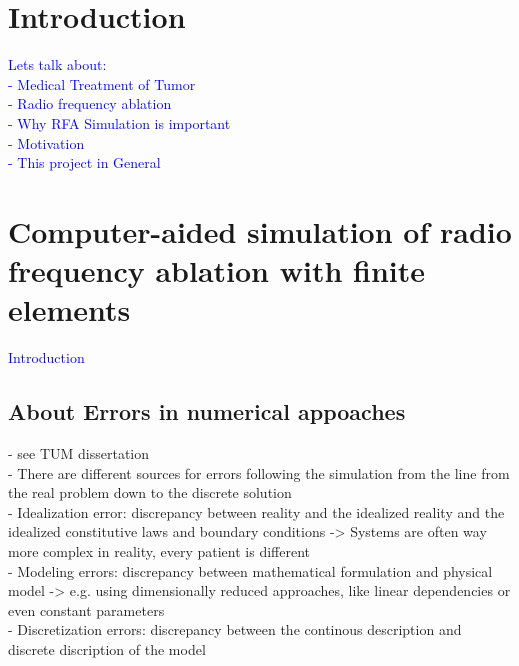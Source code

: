 \documentclass[parskip=half, titlepage=yes, 12pt, BCOR=12mm, DIV=calc]{scrartcl}
\begin{document}
\maketitle
\tableofcontents
\listoffigures
\listoftables
\lstlistoflistings
\clearpage



\section{Introduction}

\textcolor{blue}{Lets talk about:\\
- Medical Treatment of Tumor\\
- Radio frequency ablation\\
- Why RFA Simulation is important \\
- Motivation \\
- This project in General\\
}


\section{Computer-aided simulation of radio frequency ablation with finite elements}

\textcolor{blue}
{
Introduction
}

\subsection{About Errors in numerical appoaches}
- see TUM dissertation \\

- There are different sources for errors following the simulation from the line from the real problem down to the discrete solution \\

- Idealization error: discrepancy between reality and the idealized reality and the idealized constitutive laws and boundary conditions -> Systems are often way more complex in reality, every patient is different \\

- Modeling errors: discrepancy between mathematical formulation and physical model -> e.g. using dimensionally reduced approaches, like linear dependencies or even constant parameters  \\

-  Discretization errors: discrepancy between the continous description and discrete discription of the model \\
\end{document}
